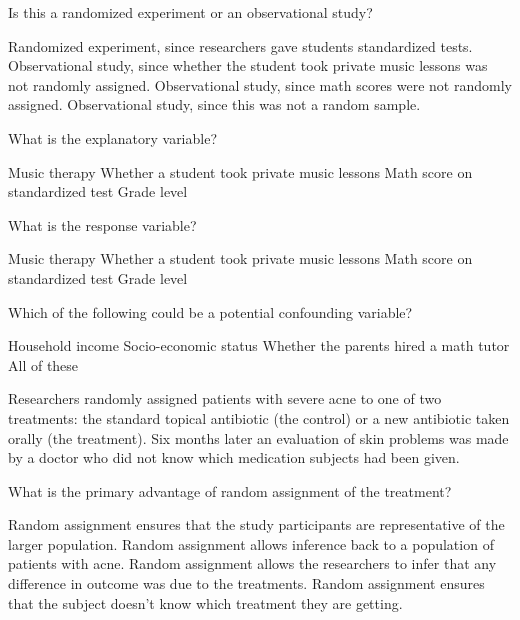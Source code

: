 \documentclass{article}
\begin{document}
\begin{mcquestions}
		\question Is this a randomized experiment or an observational study?
		\begin{mcanswerslist}
			\answer Randomized experiment, since researchers gave students standardized tests.
			\answer[correct] Observational study, since whether the student took private music lessons was not randomly assigned.
			\answer Observational study, since math scores were not randomly assigned.
			\answer Observational study, since this was not a random sample.
		\end{mcanswerslist}
		
		\question[follow] What is the explanatory variable?
		\begin{mcanswerslist}
			\answer Music therapy
			\answer[correct] Whether a student took private music lessons
			\answer Math score on standardized test
			\answer Grade level
		\end{mcanswerslist}
		
		\question[follow] What is the response variable?
		\begin{mcanswerslist}
			\answer Music therapy
			\answer Whether a student took private music lessons
			\answer[correct] Math score on standardized test
			\answer Grade level
		\end{mcanswerslist}
		
		\question[follow] Which of the following could be a potential confounding variable?
		\begin{mcanswerslist}
			\answer Household income
			\answer Socio-economic status
			\answer Whether the parents hired a math tutor
			\answer[correct] All of these
		\end{mcanswerslist}
		
		\begin{mcquestioninstruction}
			Researchers randomly assigned patients with severe acne to one of two treatments: the standard topical antibiotic (the control) or a new antibiotic taken orally (the treatment). Six months later an evaluation of skin problems was made by a doctor who did not know which medication subjects had been given.
		\end{mcquestioninstruction}
		
		\question What is the primary advantage of random assignment of the treatment?
		\begin{mcanswerslist}
			\answer Random assignment ensures that the study participants are representative of the larger population.
			\answer Random assignment allows inference back to a population of patients with acne.
			\answer[correct] Random assignment allows the researchers to infer that any difference in outcome was due to the treatments.
			\answer Random assignment ensures that the subject doesn't know which treatment they are getting.
		\end{mcanswerslist}
		

\end{mcquestions}
\end{document}
